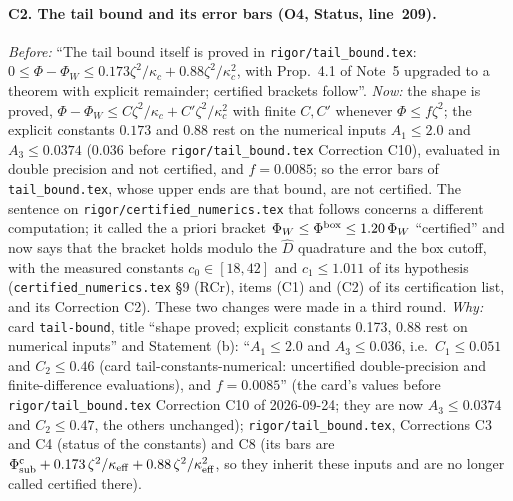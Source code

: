 \documentclass[11pt]{article}
\theoremstyle{accent}
\theoremstyle{definition}
\begin{document}
{\paragraph{C2. The tail bound and its error bars (O4, Status, line~209).}
\emph{Before:} ``The tail bound itself is proved in \texttt{rigor/tail\_bound.tex}:
\(0\le\Phi-\Phi_W\le0.173\zeta^2/\kappa_c+0.88\zeta^2/\kappa_c^2\), with Prop.~4.1 of Note~5
upgraded to a theorem with explicit remainder; certified brackets follow''.
\emph{Now:} the shape is proved, \(\Phi-\Phi_W\le C\zeta^2/\kappa_c+C'\zeta^2/\kappa_c^2\) with finite
\(C,C'\) whenever \(\Phi\le f\zeta^2\); the explicit constants \(0.173\) and \(0.88\) rest on the
numerical inputs \(A_1\le2.0\) and \(A_3\le0.0374\) (\(0.036\) before \texttt{rigor/tail\_bound.tex}
Correction C10), evaluated in double precision and not certified, and \(f=0.0085\); so the error bars
of \texttt{tail\_bound.tex}, whose upper ends are that bound, are not certified.  The sentence on
\texttt{rigor/certified\_numerics.tex} that follows concerns a different computation; it called the
a priori bracket \(\Phi_W\le\Phi^{\rm box}\le1.20\,\Phi_W\) ``certified'' and now says that the bracket
holds modulo the \(\widehat D\) quadrature and the box cutoff, with the measured constants
\(c_0\in[18,42]\) and \(c_1\le1.011\) of its hypothesis (\texttt{certified\_numerics.tex} \S9 (RCr),
items (C1) and (C2) of its certification list, and its Correction C2).  These two changes were made in
a third round.
\emph{Why:} card \texttt{tail-bound}, title ``shape proved; explicit constants 0.173, 0.88 rest on
numerical inputs'' and Statement (b): ``\(A_1\le2.0\) and \(A_3\le0.036\), i.e.\ \(C_1\le0.051\) and
\(C_2\le0.46\) (card tail-constants-numerical: uncertified double-precision and finite-difference
evaluations), and \(f=0.0085\)'' (the card's values before \texttt{rigor/tail\_bound.tex} Correction
C10 of 2026-09-24; they are now \(A_3\le0.0374\) and \(C_2\le0.47\), the others unchanged);
\texttt{rigor/tail\_bound.tex}, Corrections C3 and C4 (status of
the constants) and C8 (its bars are \(\Phi^{\rm c}_{\rm sub}+0.173\,\zeta^2/\kappa_{\rm eff}
+0.88\,\zeta^2/\kappa_{\rm eff}^2\), so they inherit these inputs and are no longer called
certified there).
}
\end{document}
